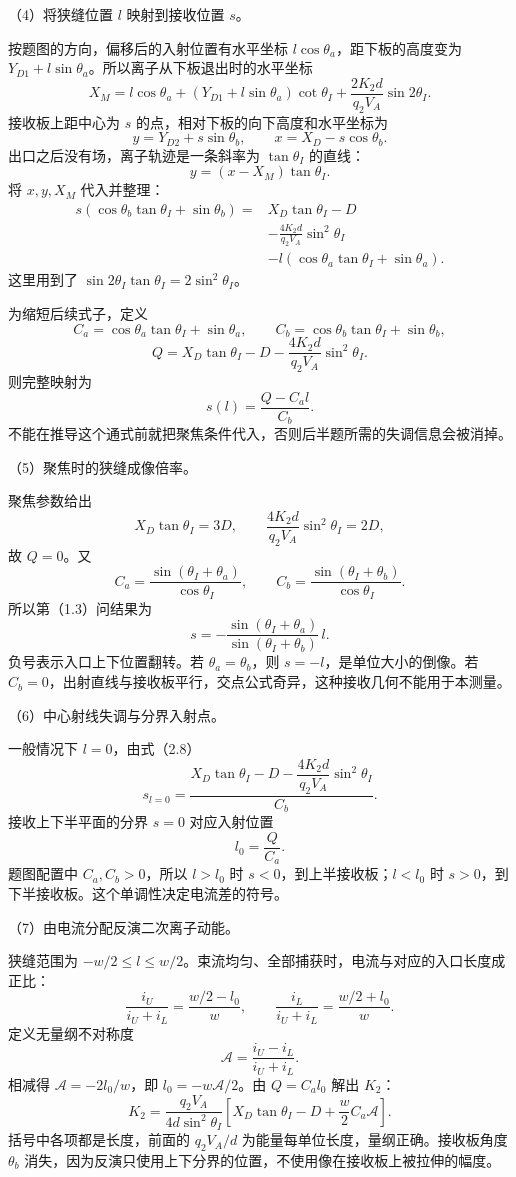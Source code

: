 \documentclass[12pt,a4paper,fontset=fandol]{ctexart}
\begin{document}
（4）将狭缝位置 \(l\) 映射到接收位置 \(s\)。

按题图的方向，偏移后的入射位置有水平坐标
\(l\cos\theta_a\)，距下板的高度变为
\(Y_{D1}+l\sin\theta_a\)。所以离子从下板退出时的水平坐标 \[
X_M=l\cos\theta_a+
(Y_{D1}+l\sin\theta_a)\cot\theta_I
+\frac{2K_2d}{q_2V_A}\sin2\theta_I.
\] 接收板上距中心为 \(s\) 的点，相对下板的向下高度和水平坐标为 \[
y=Y_{D2}+s\sin\theta_b,\qquad
x=X_D-s\cos\theta_b.
\] 出口之后没有场，离子轨迹是一条斜率为 \(\tan\theta_I\) 的直线： \[
y=(x-X_M)\tan\theta_I.
\] 将 \(x,y,X_M\) 代入并整理： \[
\begin{aligned}
s(\cos\theta_b\tan\theta_I+\sin\theta_b)
={}&X_D\tan\theta_I-D\\
&-\frac{4K_2d}{q_2V_A}\sin^2\theta_I\\
&-l(\cos\theta_a\tan\theta_I+\sin\theta_a).
\end{aligned}\tag{2.7}
\] 这里用到了 \(\sin2\theta_I\tan\theta_I=2\sin^2\theta_I\)。

为缩短后续式子，定义 \[
C_a=\cos\theta_a\tan\theta_I+\sin\theta_a,\qquad
C_b=\cos\theta_b\tan\theta_I+\sin\theta_b,
\] \[
Q=X_D\tan\theta_I-D-\frac{4K_2d}{q_2V_A}\sin^2\theta_I.
\] 则完整映射为 \[
\boxed{s(l)=\frac{Q-C_al}{C_b}.}\tag{2.8}
\]
不能在推导这个通式前就把聚焦条件代入，否则后半题所需的失调信息会被消掉。

（5）聚焦时的狭缝成像倍率。

聚焦参数给出 \[
X_D\tan\theta_I=3D,\qquad
\frac{4K_2d}{q_2V_A}\sin^2\theta_I=2D,
\] 故 \(Q=0\)。又 \[
C_a=\frac{\sin(\theta_I+\theta_a)}{\cos\theta_I},
\qquad
C_b=\frac{\sin(\theta_I+\theta_b)}{\cos\theta_I}.
\] 所以第（1.3）问结果为 \[
\boxed{s=-\frac{\sin(\theta_I+\theta_a)}
{\sin(\theta_I+\theta_b)}\,l.}\tag{2.9}
\] 负号表示入口上下位置翻转。若 \(\theta_a=\theta_b\)，则
\(s=-l\)，是单位大小的倒像。若
\(C_b=0\)，出射直线与接收板平行，交点公式奇异，这种接收几何不能用于本测量。

（6）中心射线失调与分界入射点。

一般情况下 \(l=0\)，由式（2.8） \[
\boxed{s_{l=0}=\frac{
X_D\tan\theta_I-D-\dfrac{4K_2d}{q_2V_A}\sin^2\theta_I
}{C_b}.}\tag{2.10}
\] 接收上下半平面的分界 \(s=0\) 对应入射位置 \[
\boxed{l_0=\frac{Q}{C_a}.}\tag{2.11}
\] 题图配置中 \(C_a,C_b>0\)，所以 \(l>l_0\) 时
\(s<0\)，到上半接收板；\(l<l_0\) 时
\(s>0\)，到下半接收板。这个单调性决定电流差的符号。

（7）由电流分配反演二次离子动能。

狭缝范围为
\(-w/2\le l\le w/2\)。束流均匀、全部捕获时，电流与对应的入口长度成正比：
\[
\frac{i_U}{i_U+i_L}=\frac{w/2-l_0}{w},
\qquad
\frac{i_L}{i_U+i_L}=\frac{w/2+l_0}{w}.
\] 定义无量纲不对称度 \[
\mathcal A=\frac{i_U-i_L}{i_U+i_L}.
\] 相减得 \(\mathcal A=-2l_0/w\)，即 \(l_0=-w\mathcal A/2\)。由
\(Q=C_al_0\) 解出 \(K_2\)： \[
\boxed{
K_2=\frac{q_2V_A}{4d\sin^2\theta_I}
\left[
X_D\tan\theta_I-D+\frac w2 C_a\mathcal A
\right].}\tag{2.12}
\] 括号中各项都是长度，前面的 \(q_2V_A/d\)
为能量每单位长度，量纲正确。接收板角度 \(\theta_b\)
消失，因为反演只使用上下分界的位置，不使用像在接收板上被拉伸的幅度。
\end{document}
